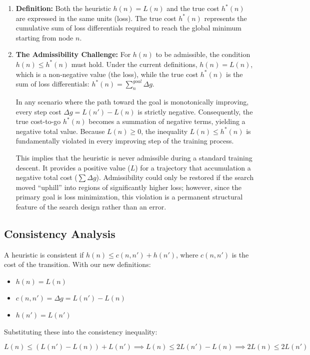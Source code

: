 \begin{enumerate}
    \item \textbf{Definition:} Both the heuristic $h(n) = L(n)$ and the true cost $h^*(n)$ are expressed in the same units (loss). The true cost $h^*(n)$ represents the cumulative sum of loss differentials required to reach the global minimum starting from node $n$.
    \item \textbf{The Admissibility Challenge:} For $h(n)$ to be admissible, the condition $h(n) \le h^*(n)$ must hold. Under the current definitions, $h(n) = L(n)$, which is a non-negative value (the loss), while the true cost $h^*(n)$ is the sum of loss differentials: $h^*(n) = \sum_{n}^{goal} \Delta g$.

In any scenario where the path toward the goal is monotonically improving, every step cost $\Delta g = L(n') - L(n)$ is strictly negative. Consequently, the true cost-to-go $h^*(n)$ becomes a summation of negative terms, yielding a negative total value. Because $L(n) \ge 0$, the inequality $L(n) \le h^*(n)$ is fundamentally violated in every improving step of the training process. 

This implies that the heuristic is never admissible during a standard training descent. It provides a positive value ($L$) for a trajectory that accumulation a negative total cost ($\sum \Delta g$). Admissibility could only be restored if the search moved ``uphill'' into regions of significantly higher loss; however, since the primary goal is loss minimization, this violation is a permanent structural feature of the search design rather than an error.
\end{enumerate}

\subsection{Consistency Analysis}
\label{sec:consistency_analysis}

A heuristic is consistent if $h(n) \le c(n, n') + h(n')$, where $c(n, n')$ is the cost of the transition. With our new definitions:
\begin{itemize}
    \item $h(n) = L(n)$
    \item $c(n, n') = \Delta g = L(n') - L(n)$
    \item $h(n') = L(n')$
\end{itemize}

Substituting these into the consistency inequality:

$$L(n) \le (L(n') - L(n)) + L(n') \implies L(n) \le 2L(n') - L(n) \implies 2L(n) \le 2L(n')$$

